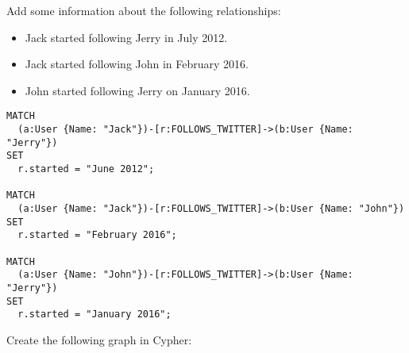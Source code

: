 \begin{questions}
\question
Add some information about the following relationships:
\begin{itemize}
  \item Jack started following Jerry in July 2012.
  \item Jack started following John in February 2016.
  \item John started following Jerry on January 2016.
\end{itemize}

\begin{solution}
  \begin{verbatim}
MATCH
  (a:User {Name: "Jack"})-[r:FOLLOWS_TWITTER]->(b:User {Name: "Jerry"})
SET
  r.started = "June 2012";
	
MATCH
  (a:User {Name: "Jack"})-[r:FOLLOWS_TWITTER]->(b:User {Name: "John"})
SET
  r.started = "February 2016";
	
MATCH
  (a:User {Name: "John"})-[r:FOLLOWS_TWITTER]->(b:User {Name: "Jerry"})
SET
  r.started = "January 2016";
  \end{verbatim}
\end{solution}

\question
  Create the following graph in Cypher:
  \begin{center}
  \end{center}
\begin{solution}
  \begin{verbatim}
    
  \end{verbatim}
\end{solution}




\end{questions}

%
